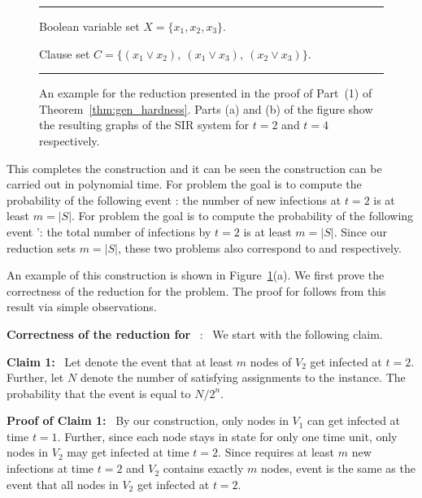 \begin{figure}[tbh]
\rule{\textwidth}{0.01in}
\smallskip
\noindent
Boolean variable set $X = \{x_1, x_2, x_3\}$.

\smallskip
Clause set $C = \{(x_1 \vee x_2),~ (x_1 \vee x_3),~ (x_2 \vee x_3)\}$.

\medskip
\begin{center}

\end{center}
\caption{An example for the reduction presented in
the proof of Part~(1) of Theorem~\ref{thm:gen_hardness}.
Parts (a) and (b) of the figure show the resulting
graphs of the SIR system for $t = 2$ and $t = 4$ respectively.
}
\label{fig:tnewinf_proof}
\smallskip
\rule{\textwidth}{0.01in}
\end{figure}

This completes the construction and 
it can be seen the construction can be carried out in polynomial time.
For problem \TwoNewInfs{} 
the goal is to compute the probability of the following event \cale:
the number of new infections at $t = 2$ is at least $m = |S|$.  
For problem \TwoTotInfs{} 
the goal is to compute the probability of the following event \cale':
the total number of infections by $t = 2$ is at least $m = |S|$.  
Since our reduction sets $m = |S|$, these two problems also correspond to 
\TwoVuls{} and \TwoTotVuls{} respectively.

\medskip
An example of this construction is shown in
Figure~\ref{fig:tnewinf_proof}(a).
We first prove the correctness of the reduction for the \TwoNewInfs{}
problem.
The proof for \TwoTotInfs{} follows from this result
via simple observations.

\medskip
\noindent
\textbf{Correctness of the reduction for}~ \TwoNewInfs:~
We start with the following claim.

\medskip
\noindent
\textbf{Claim 1:}~ Let \cale{} denote the event that at least 
$m$ nodes of $V_2$ get infected at $t = 2$.
Further, let $N$ denote the number of satisfying assignments 
to the \mtsat{} instance.
The probability that the event \cale{} is equal to $N/2^n$.

\noindent
\textbf{Proof of Claim 1:}~ By our construction, only nodes in $V_1$
can get infected at time $t = 1$.
Further, since each node stays in state \istate{} for only one time
unit, only nodes in $V_2$ may get infected at time $t = 2$.
Since \cale{} requires at least $m$ new infections at time $t = 2$
and $V_2$ contains exactly $m$ nodes, event \cale{} is the same
as the event that all nodes in $V_2$ get infected at $t = 2$.

